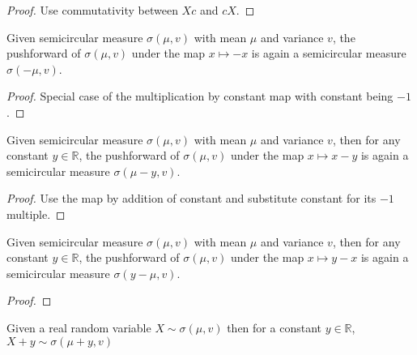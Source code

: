 \begin{proof}
  \leanok
  Use commutativity between $Xc$ and $cX$.
\end{proof}


\begin{lemma}
  \label{lem:semicircleReal_map_neg}
  \leanok
  Given semicircular measure $\sigma(\mu, v)$ with mean $\mu$ and variance $v$, the pushforward
  of $\sigma(\mu, v)$ under the map $x \mapsto -x$ is again a semicircular measure $\sigma(- \mu, v)$.
\end{lemma}

\begin{proof}
  \leanok
  Special case of the multiplication by constant map with constant being $-1$.
\end{proof}



\begin{lemma}
  \label{lem:semicircleReal_map_sub_const}
  \leanok
  Given semicircular measure $\sigma(\mu, v)$ with mean $\mu$ and variance $v$, then for any constant $y \in \mathbb{R}$, the pushforward
  of $\sigma(\mu, v)$ under the map $x \mapsto x - y$ is again a semicircular measure $\sigma( \mu - y, v)$.
\end{lemma}

\begin{proof}
  \leanok
  Use the map by addition of constant and substitute constant for its $-1$ multiple.
\end{proof}


\begin{lemma}
  \label{lem:semicircleReal_map_const_sub}
  \leanok
   Given semicircular measure $\sigma(\mu, v)$ with mean $\mu$ and variance $v$, then for any constant $y \in \mathbb{R}$, the pushforward
  of $\sigma(\mu, v)$ under the map $x \mapsto y - x$ is again a semicircular measure $\sigma(y - \mu, v)$.
\end{lemma}

\begin{proof}
  \leanok
\end{proof}


\begin{lemma}
  \label{lem:semicircleReal_add_const}
  \leanok
  Given a real random variable $X \sim \sigma(\mu, v)$
  then for a constant $y \in \mathbb{R}$, $X + y \sim \sigma(\mu + y, v)$
\end{lemma}

